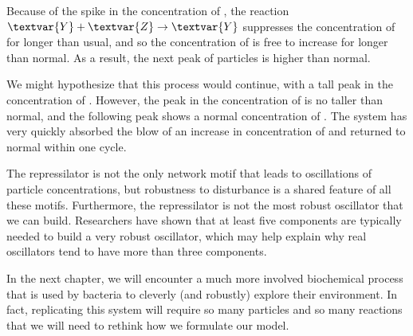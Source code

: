 Because of the spike in the concentration of , the reaction $\textvar{Y} + \textvar{Z} \rightarrow \textvar{Y}$ suppresses the concentration of  for longer than usual, and so the concentration of  is free to increase for longer than normal. As a result, the next peak of  particles is higher than normal.

We might hypothesize that this process would continue, with a tall peak in the concentration of . However, the peak in the concentration of  is no taller than normal, and the following peak shows a normal concentration of . The system has very quickly absorbed the blow of an increase in concentration of  and returned to normal within one cycle.

%

The repressilator is not the only network motif that leads to oscillations of particle concentrations, but robustness to disturbance is a shared feature of all these motifs. Furthermore, the repressilator is not the most robust oscillator that we can build. Researchers have shown that at least five components are typically needed to build a very robust oscillator, which may help explain why real oscillators tend to have more than three components.


In the next chapter, we will encounter a much more involved biochemical process that is used by bacteria to cleverly (and robustly) explore their environment. In fact, replicating this system will require so many particles and so many reactions that we will need to rethink how we formulate our model.\\

